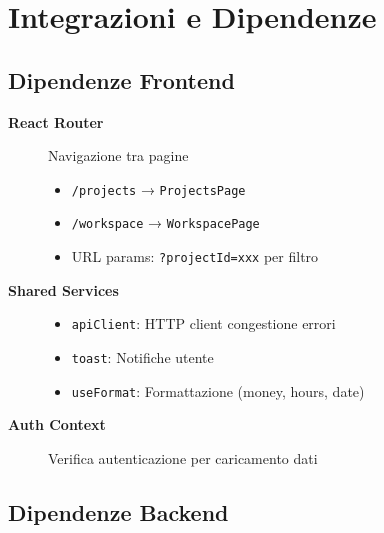 \documentclass[11pt,a4paper]{article}
\begin{document}
\newpage

\section{Integrazioni e Dipendenze}

\subsection{Dipendenze Frontend}

\begin{description}
    \item[\textbf{React Router}] Navigazione tra pagine
    \begin{itemize}
        \item \texttt{/projects} → \texttt{ProjectsPage}
        \item \texttt{/workspace} → \texttt{WorkspacePage}
        \item URL params: \texttt{?projectId=xxx} per filtro
    \end{itemize}
    
    \item[\textbf{Shared Services}]
    \begin{itemize}
        \item \texttt{apiClient}: HTTP client congestione errori
        \item \texttt{toast}: Notifiche utente
        \item \texttt{useFormat}: Formattazione (money, hours, date)
    \end{itemize}
    
    \item[\textbf{Auth Context}] Verifica autenticazione per caricamento dati
\end{description}

\subsection{Dipendenze Backend}
\end{document}
